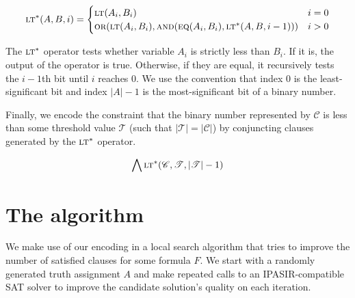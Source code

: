 \documentclass{article}
\begin{document}
\begin{equation}
  \textsc{lt}^*(A, B, i) = \begin{cases}
    \textsc{lt}(A_i, B_i) & i = 0 \\
    \textsc{or}(\textsc{lt}(A_i, B_i), \textsc{and}(\textsc{eq}(A_i, B_i), \textsc{lt}^*(A, B, i - 1))) & i > 0
  \end{cases}
\end{equation}\break

\noindent The $\textsc{lt}^*$ operator tests whether variable $A_i$ is strictly
less than $B_i$. If it is, the output of the operator is true. Otherwise, if
they are equal, it recursively tests the $i - 1$th bit until $i$ reaches $0$. We
use the convention that index $0$ is the least-significant bit and index $\vert
A \vert - 1$ is the most-significant bit of a binary number.

Finally, we encode the constraint that the binary number represented by
$\mathscr{C}$ is less than some threshold value $\mathscr{T}$ (such that  $\vert
\mathscr{T} \vert = \vert \mathscr{C} \vert$) by conjuncting clauses generated
by the $\textsc{lt}^*$ operator.

\begin{equation}
  \bigwedge \textsc{lt}^*(\mathscr{C}, \mathscr{T}, \vert \mathscr{T} \vert - 1)
\end{equation}

\break

\section{The algorithm}

We make use of our encoding in a local search algorithm that tries to improve
the number of satisfied clauses for some formula $F$. We start with a randomly
generated truth assignment $A$ and make repeated calls to an IPASIR-compatible
SAT solver to improve the candidate solution's quality on each iteration. \\
\end{document}
